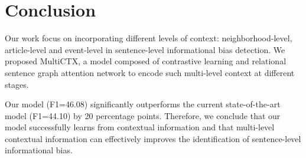 \section{Conclusion}

Our work focus on incorporating different levels of context: neighborhood-level, article-level and event-level in sentence-level informational bias detection. We proposed MultiCTX, a model composed of contrastive learning and relational sentence graph attention network to encode such multi-level context at different stages.

Our model (F1=46.08) significantly outperforms the current state-of-the-art model (F1=44.10) by 20 percentage points. Therefore, we conclude that our model successfully learns from contextual information and that multi-level contextual information can effectively improves 
the identification of sentence-level informational bias. 




